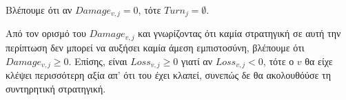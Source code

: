   Βλέπουμε ότι αν $Damage_{v, j} = 0$, τότε $Turn_j = \emptyset$.

  Από τον ορισμό του $Damage_{v,j}$ και γνωρίζοντας ότι καμία στρατηγική σε αυτή την περίπτωση δεν μπορεί να αυξήσει καμία
  άμεση εμπιστοσύνη, βλέπουμε ότι $Damage_{v,j} \geq 0$. Επίσης, είναι $Loss_{v,j} \geq 0$ γιατί αν $Loss_{v,j} < 0$, τότε ο
  $v$ θα είχε κλέψει περισσότερη αξία απ' ότι του έχει κλαπεί, συνεπώς δε θα ακολουθόύσε τη συντηρητική στρατηγική.
